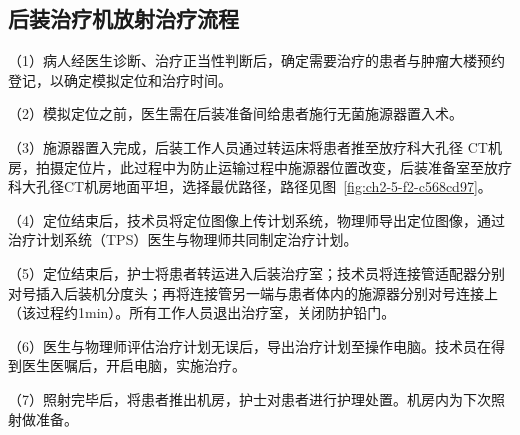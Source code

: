 \subsection{后装治疗机放射治疗流程}

（1）病人经医生诊断、治疗正当性判断后，确定需要治疗的患者与肿瘤大楼预约登记，以确定模拟定位和治疗时间。

（2）模拟定位之前，医生需在后装准备间给患者施行无菌施源器置入术。

（3）施源器置入完成，后装工作人员通过转运床将患者推至放疗科大孔径 CT机房，拍摄定位片，此过程中为防止运输过程中施源器位置改变，后装准备室至放疗科大孔径CT机房地面平坦，选择最优路径，路径见图~\ref{fig:ch2-5-f2-c568cd97}。

（4）定位结束后，技术员将定位图像上传计划系统，物理师导出定位图像，通过治疗计划系统（TPS）医生与物理师共同制定治疗计划。

（5）定位结束后，护士将患者转运进入后装治疗室；技术员将连接管适配器分别对号插入后装机分度头；再将连接管另一端与患者体内的施源器分别对号连接上（该过程约1min）。所有工作人员退出治疗室，关闭防护铅门。

（6）医生与物理师评估治疗计划无误后，导出治疗计划至操作电脑。技术员在得到医生医嘱后，开启电脑，实施治疗。

（7）照射完毕后，将患者推出机房，护士对患者进行护理处置。机房内为下次照射做准备。

